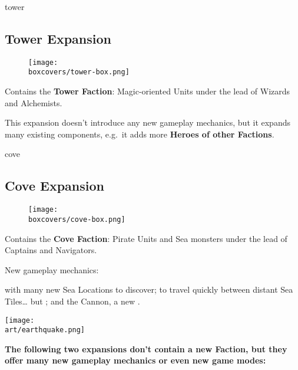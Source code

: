 \begin{multicols}{2}
\begin{expansion}[title=]{tower}
  \subsection*{\color{tower}Tower Expansion}
  \setlength\intextsep{0pt}
  \setlength\columnsep{0.8em}
  \begin{wrapfigure}{l}{0.35\textwidth}
    \texttt{[image: \\boxcovers/tower-box.png]}
  \end{wrapfigure}
  Contains the \textbf{Tower Faction}: Magic-oriented Units under the lead of Wizards and Alchemists.\par
  \medskip
  This expansion doesn't introduce any new gameplay mechanics, but it expands many existing components, e.g.~it adds more \textbf{Heroes of other Factions}.
\end{expansion}
\vspace*{\fill}
\columnbreak

\begin{expansion}[title=]{cove}
  \subsection*{\color{cove}Cove Expansion}
  \setlength\intextsep{0pt}
  \setlength\columnsep{0.8em}
  \begin{wrapfigure}{l}{0.35\textwidth}
    \texttt{[image: \\boxcovers/cove-box.png]}
  \end{wrapfigure}
  Contains the \textbf{Cove Faction}: Pirate Units and Sea monsters under the lead of Captains and Navigators.\par
  \medskip
  New gameplay mechanics:\par
  \smallskip
   with many new Sea Locations to discover;  to travel quickly between distant Sea Tiles… but ; and the Cannon, a new .
\end{expansion}

\begin{center}
\hfill{}\texttt{[image: \\art/earthquake.png]}
\end{center}

\end{multicols}

\textbf{The following two expansions don't contain a new Faction, but they offer many new gameplay mechanics or even new game modes:}

